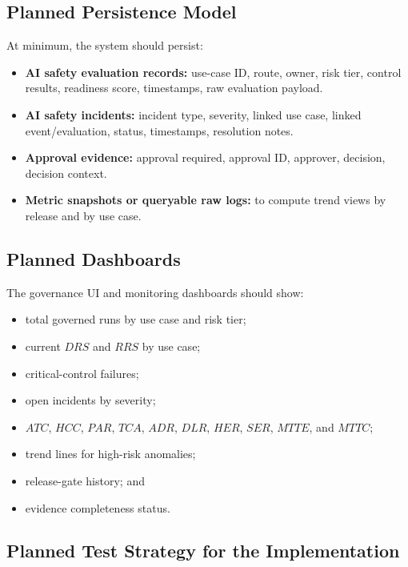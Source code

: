 \documentclass[11pt,a4paper]{article}
\begin{document}
\subsection{Planned Persistence Model}

At minimum, the system should persist:

\begin{itemize}[nosep]
    \item \textbf{AI safety evaluation records:} use-case ID, route, owner, risk tier, control results, readiness score, timestamps, raw evaluation payload.
    \item \textbf{AI safety incidents:} incident type, severity, linked use case, linked event/evaluation, status, timestamps, resolution notes.
    \item \textbf{Approval evidence:} approval required, approval ID, approver, decision, decision context.
    \item \textbf{Metric snapshots or queryable raw logs:} to compute trend views by release and by use case.
\end{itemize}

\subsection{Planned Dashboards}

The governance UI and monitoring dashboards should show:

\begin{itemize}[nosep]
    \item total governed runs by use case and risk tier;
    \item current \(DRS\) and \(RRS\) by use case;
    \item critical-control failures;
    \item open incidents by severity;
    \item \(ATC\), \(HCC\), \(PAR\), \(TCA\), \(ADR\), \(DLR\), \(HER\), \(SER\), \(MTTE\), and \(MTTC\);
    \item trend lines for high-risk anomalies;
    \item release-gate history; and
    \item evidence completeness status.
\end{itemize}

\subsection{Planned Test Strategy for the Implementation}
\end{document}
